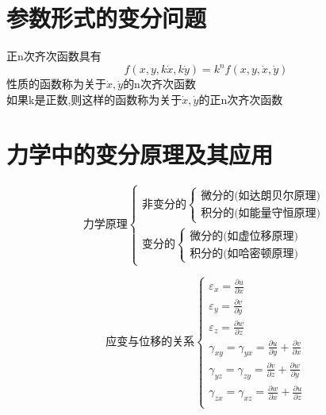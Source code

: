 \documentclass{book}
\begin{document}
\section{参数形式的变分问题}
正n次齐次函数具有
$$ f(x,y,k\dot{x},k\dot{y})=k^nf(x,y,\dot{x},\dot{y}) $$
性质的函数称为关于$\dot{x},\dot{y}$的n次齐次函数\\
如果k是正数,则这样的函数称为关于$\dot{x},\dot{y}$的正n次齐次函数

\section{力学中的变分原理及其应用}
$$
\text{力学原理}
\left\{
	\begin{array}{ll}
	 \text{非变分的}
	 	\left\{
			\begin{array}{ll}
                    \text{微分的(如达朗贝尔原理)}\\
                    \text{积分的(如能量守恒原理)}
			\end{array}
			\right.  \\
	 \text{变分的}
	 	\left\{
			\begin{array}{ll}
                    \text{微分的(如虚位移原理)}\\
                    \text{积分的(如哈密顿原理)}
			\end{array}
			\right.
	\end{array}
	\right.
$$

\begin{equation}
\text{应变与位移的关系}
\left\{
	\begin{array}{ll}
	\varepsilon_x = \frac{\partial u}{\partial x} \\
	\varepsilon_y = \frac{\partial v}{\partial y} \\
	\varepsilon_z = \frac{\partial w}{\partial z} \\
    \gamma_{xy} = \gamma_{yx} = \frac{\partial u}{\partial y}+ \frac{\partial v}{\partial x}\\
    \gamma_{yz} = \gamma_{zy} = \frac{\partial v}{\partial z}+ \frac{\partial w}{\partial y}\\
    \gamma_{zx} = \gamma_{xz} = \frac{\partial w}{\partial x}+ \frac{\partial u}{\partial z}\\
	\end{array}
	\right.
\label{equation.cauchy}
\end{equation}
\end{document}
